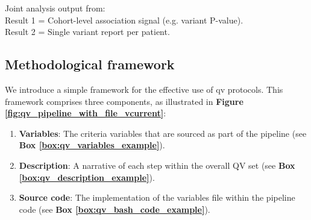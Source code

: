 \begin{tcolorbox}[
    colback=white!0,
    colframe=black,
    boxrule=1pt,
    arc=1mm,
    outer arc=1mm,
    title=\textbf{\refstepcounter{myboxcounter}\label{box:pipe}Box \themyboxcounter: Example diagrammatic representation}
]
\medskip

Joint analysis output from:\\
Result 1 = Cohort-level association signal (e.g. variant P-value).\\
Result 2 = Single variant report per patient.
\end{tcolorbox}


\subsection{Methodological framework} \label{sec:framework}
We introduce a simple framework for the effective use of \ac{qv}  protocols. This framework comprises three components, as illustrated in \textbf{Figure \ref{fig:qv_pipeline_with_file_vcurrent}}:
\begin{enumerate}
    \item \textbf{Variables}: The criteria variables that are sourced as part of the pipeline (see \textbf{Box \ref{box:qv_variables_example}}).
    \item \textbf{Description}: A narrative of each step within the overall QV set (see \textbf{Box \ref{box:qv_description_example}}).
    \item \textbf{Source code}: The implementation of the variables file within the pipeline code (see \textbf{Box \ref{box:qv_bash_code_example}}).
\end{enumerate}



